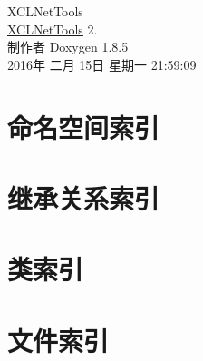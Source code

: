 \documentclass[twoside]{book}
\newcommand{\clearemptydoublepage}{%
  \newpage{\pagestyle{empty}\cleardoublepage}%
}
\begin{document}
\hypersetup{pageanchor=false}
\begin{titlepage}
\vspace*{7cm}
\begin{center}%
{\Large X\-C\-L\-Net\-Tools \\[1ex]\large \hyperlink{namespace_x_c_l_net_tools}{X\-C\-L\-Net\-Tools} 2. }\\
\vspace*{1cm}
{\large 制作者 Doxygen 1.8.5}\\
\vspace*{0.5cm}
{\small 2016年 二月 15日 星期一 21:59:09}\\
\end{center}
\end{titlepage}
\clearemptydoublepage
\tableofcontents
\clearemptydoublepage
{}
\hypersetup{pageanchor=true}

\chapter{命名空间索引}

\chapter{继承关系索引}

\chapter{类索引}

\chapter{文件索引}

\end{document}
